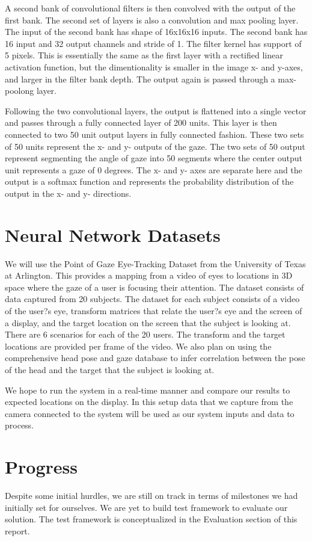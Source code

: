 \documentclass[10pt,twocolumn,letterpaper]{article}
\begin{document}
A second bank of convolutional filters is then convolved with the
output of the first bank. The second set of layers is also a
convolution and max pooling layer. The input of the second bank has
shape of 16x16x16 inputs. The second bank has 16 input and 32 output
channels and stride of 1. The filter kernel has support of 5
pixels. This is essentially the same as the first layer with a
rectified linear activation function, but the dimentionality is
smaller in the image x- and y-axes, and larger in the filter bank
depth. The output again is passed through a max-poolong layer.

Following the two convolutional layers, the output is flattened into a
single vector and passes through a fully connected layer of 200
units. This layer is then connected to two 50 unit output layers in
fully connected fashion. These two sets of 50 units represent the x-
and y- outputs of the gaze. The two sets of 50 output represent
segmenting the angle of gaze into 50 segments where the center output
unit represents a gaze of 0 degrees. The x- and y- axes are separate
here and the output is a softmax function and represents the
probability distribution of the output in the x- and y- directions.

\section{Neural Network Datasets}
We will use the Point of Gaze Eye-Tracking Dataset from the University
of Texas at Arlington\cite{eyetracking}. This provides a mapping from
a video of eyes to locations in 3D space where the gaze of a user is
focusing their attention. The dataset consists of data captured from
20 subjects. The dataset for each subject consists of a video of the
user?s eye, transform matrices that relate the user?s eye and the
screen of a display, and the target location on the screen that the
subject is looking at. There are 6 scenarios for each of the 20
users. The transform and the target locations are provided per frame
of the video. We also plan on using the comprehensive head pose and
gaze database\cite{mcmurrough} to infer correlation between the pose
of the head and the target that the subject is looking at.

We hope to run the system in a real-time manner and compare our
results to expected locations on the display. In this setup data that
we capture from the camera connected to the system will be used as our
system inputs and data to process.

\section{Progress}
Despite some initial hurdles, we are still on track in terms of milestones 
we had initially set for ourselves. We are yet to build test framework 
to evaluate our solution. The test framework is conceptualized 
in the Evaluation section of this report.
\end{document}
